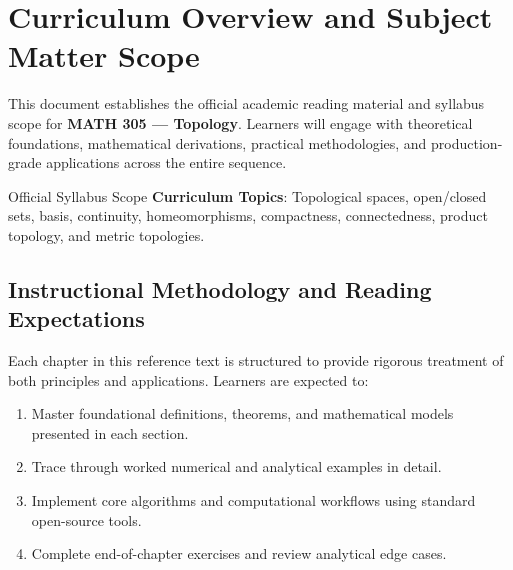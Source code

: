 \section{Curriculum Overview and Subject Matter Scope}

This document establishes the official academic reading material and syllabus scope for \textbf{MATH 305 --- Topology}. Learners will engage with theoretical foundations, mathematical derivations, practical methodologies, and production-grade applications across the entire sequence.

\begin{InsightBox}{Official Syllabus Scope}
  \textbf{Curriculum Topics}: Topological spaces, open/closed sets, basis, continuity, homeomorphisms, compactness, connectedness, product topology, and metric topologies.
\end{InsightBox}

\subsection{Instructional Methodology and Reading Expectations}

Each chapter in this reference text is structured to provide rigorous treatment of both principles and applications. Learners are expected to:
\begin{enumerate}
  \item Master foundational definitions, theorems, and mathematical models presented in each section.
  \item Trace through worked numerical and analytical examples in detail.
  \item Implement core algorithms and computational workflows using standard open-source tools.
  \item Complete end-of-chapter exercises and review analytical edge cases.
\end{enumerate}


